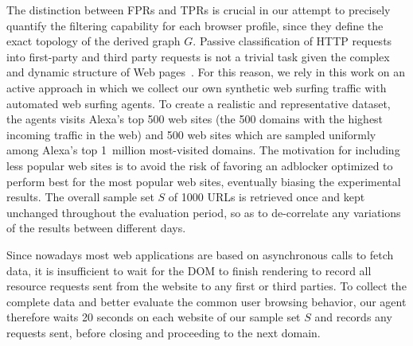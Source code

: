 \documentclass[compsoc, conference, letterpaper, 10pt, times]{IEEEtran}
\begin{document}
The distinction between FPRs and TPRs is crucial in our attempt to precisely quantify the filtering capability for each browser profile, since they define the exact topology of the derived graph $G$.
Passive classification of HTTP requests into first-party and third party requests is not a trivial task given the complex and dynamic structure of Web pages~\cite{pujol}. For this reason, we rely in this work on an active approach in which we collect our own synthetic web surfing traffic with  automated web surfing agents. To create a realistic and representative dataset, the agents visits Alexa's top 500 web sites (the 500 domains with the highest incoming traffic in the web) and 500 web sites which are sampled uniformly among Alexa's top 1~million most-visited domains. The motivation for including less popular web sites is to avoid the risk of favoring an adblocker optimized to perform best for the most popular web sites, eventually biasing the experimental results. The overall sample set $S$ of 1000 URLs is retrieved once and kept unchanged throughout the evaluation period, so as to de-correlate any variations of the results between different days.


Since nowadays most web applications are based on asynchronous calls to fetch data, it is insufficient to wait for the DOM to finish rendering to record all resource requests sent from the website to any first or third parties. To collect the complete data and better evaluate the common user browsing behavior, our agent therefore waits 20 seconds on each website of our sample set $S$ and records any requests sent, before closing and proceeding to the next domain.
\end{document}
